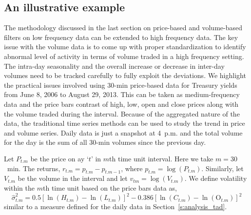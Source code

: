 \subsection{An illustrative example \label{sec:illus_ex}}


The methodology discussed in the last section on price-based and volume-based filters on low frequency data can be extended to high frequency data. The key issue with the volume data is to come up with proper standardization to identify abnormal level of activity in terms of volume traded in a high frequency setting. The intra-day seasonality and the overall increase or decrease in inter-day volumes need to be tracked carefully to fully exploit the deviations. We highlight the practical issues involved using 30-min price-based data for Treasury yields from June 8, 2006 to August 29, 2013. This can be taken as medium-frequency data and the price bars contrast of high, low, open and close prices along with the volume traded during the interval. Because of the aggregated nature of the data, the traditional time series methods can be used to study the trend in price and volume series. Daily data is just a snapshot at 4~p.m. and the total volume for the day is the sum of all 30-min volumes since the previous day.


Let $P_{t. m}$ be the price on ay `$t$' in $m$th time unit interval. Here we take $m=30$~min. The returns, $r_{t. m}= p_{t. m} - p_{t . m-1}$, where $p_{t. m}=\log(P_{t.m})$. Similarly, let $V_{t.m}$ be the volume in the interval and let $v_{tm}= \log(V_{t. m})$. We define volatility within the $m$th time unit based on the price bars data as,
	\begin{equation} \label{eqn:hatsigmasq}
	\hat{\sigma}_{t. m}^2= 0.5 [ \ln(H_{t. m}) - \ln(L_{t.m})]^2 - 0.386[\ln(C_{t.m}) - \ln(\text{O}_{t . m})]^2
	\end{equation}
similar to a measure defined for the daily data in Section~\ref{s:analysis_tad}.

